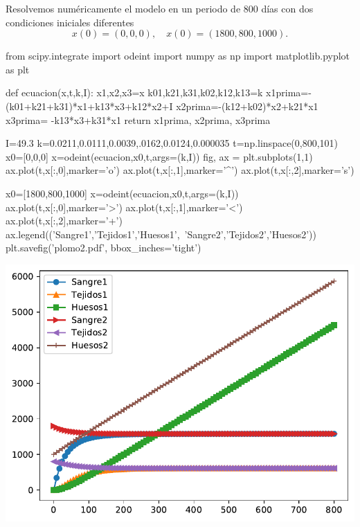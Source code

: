 Resolvemos numéricamente el modelo en un periodo de 800 días con dos condiciones iniciales diferentes
\[
 x(0)=(0,0,0),\quad x(0)=(1800,800,1000).
\]
 

\begin{sympyblock}[][numbers=left,frame=single,framesep=5mm]
from scipy.integrate import odeint 
import numpy as np
import matplotlib.pyplot as plt
\end{sympyblock}


\begin{sympyblock}[][numbers=left,frame=single,framesep=5mm]
def ecuacion(x,t,k,I):
    x1,x2,x3=x
    k01,k21,k31,k02,k12,k13=k
    x1prima=-(k01+k21+k31)*x1+k13*x3+k12*x2+I
    x2prima=-(k12+k02)*x2+k21*x1
    x3prima= -k13*x3+k31*x1
    return x1prima, x2prima, x3prima 
\end{sympyblock}

 

\begin{sympyblock}[][numbers=left,frame=single,framesep=5mm]
I=49.3
k=0.0211,0.0111,0.0039,.0162,0.0124,0.000035 
t=np.linspace(0,800,101)
x0=[0,0,0]
x=odeint(ecuacion,x0,t,args=(k,I))
fig, ax = plt.subplots(1,1)
ax.plot(t,x[:,0],marker='o')
ax.plot(t,x[:,1],marker='^')
ax.plot(t,x[:,2],marker='s')
\end{sympyblock}
 
\begin{sympyblock}[][numbers=left,frame=single,framesep=5mm]
x0=[1800,800,1000]
x=odeint(ecuacion,x0,t,args=(k,I))
ax.plot(t,x[:,0],marker='>')
ax.plot(t,x[:,1],marker='<')
ax.plot(t,x[:,2],marker='+')
ax.legend(('Sangre1','Tejidos1','Huesos1',\
    'Sangre2','Tejidos2','Huesos2'))
plt.savefig('plomo2.pdf', bbox_inches='tight')
\end{sympyblock}

\begin{center}
\includegraphics[scale=.5]{plomo2.pdf}
\end{center}
 

